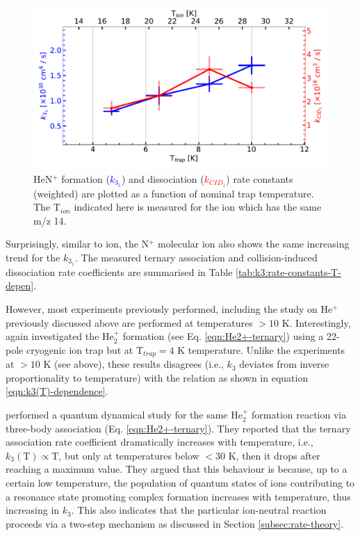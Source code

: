 \begin{figure}[!htb]
    \centering
    \includegraphics[width=1\textwidth]{figures/measurements/kinetics/functionOf_T/N+/off_k3_kCID_as_functionOfT_with_Tcol.pdf}
    \caption{HeN$^+$ formation (\textcolor{blue}{$k_{3_1}$}) and dissociation (\textcolor{red}{$k_{CID_1}$}) rate constants (weighted) are plotted as a function of nominal trap temperature. The T$_{ion}$ indicated here is measured for the \CD ion which has the same m/z 14.}
    \label{fig:HeN+:rate-constants-f(t)}
\end{figure}


Surprisingly, similar to \CD ion, the N$^+$ molecular ion also shows the same increasing trend for the $k_{3_1}$. The measured ternary association and collision-induced dissociation rate coefficients are summarised in Table \ref{tab:k3:rate-constants-T-depen}.

However, most experiments previously performed, including the study on He$^+$
previously discussed above are performed at temperatures $>10$ K.
Interestingly, \citet{gerlich_infrared_2018} again investigated the He$_2^+$
formation (see Eq. \ref{eqn:He2+-ternary}) using a 22-pole cryogenic ion trap
but at T$_{trap}=4$ K temperature. Unlike the experiments at $>10$ K (see
above), these results disagrees (i.e., $k_3$ deviates from inverse proportionality to temperature) with the
relation as shown in equation \ref{eqn:k3(T)-dependence}.

\citet{xie_quantum_2003} performed a quantum dynamical study for the same He$_2^+$ formation reaction via three-body association (Eq. \ref{eqn:He2+-ternary}). They reported that the ternary association rate coefficient dramatically increases with temperature, i.e., $k_3(\text{T}) \propto \text{T}$, but only at temperatures below $< 30$ K, then it drops after reaching a maximum value. They argued that this behaviour is because, up to a certain low temperature, the population of quantum states of ions contributing to a resonance state promoting complex formation increases with temperature, thus increasing in $k_3$. This also indicates that the particular ion-neutral reaction proceeds via a two-step mechanism as discussed in Section \ref{subsec:rate-theory}.

